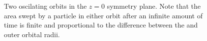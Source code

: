 \begin{figure}[!htbp]
  \centering
  \caption{Two oscilating orbits in the $z = 0$ symmetry plane. Note that the area swept by a particle in either orbit after an infinite amount of time is finite and proportional to the difference between the and outer orbital radii.}
  \label{ch:penrose_binaries/fig:z_orbits}
\end{figure}

